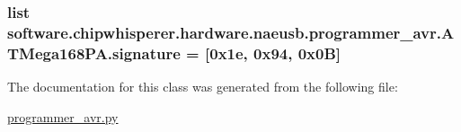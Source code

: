 \subsubsection[{signature}]{\setlength{\rightskip}{0pt plus 5cm}list software.\+chipwhisperer.\+hardware.\+naeusb.\+programmer\+\_\+avr.\+A\+T\+Mega168\+P\+A.\+signature = \mbox{[}0x1e, 0x94, 0x0\+B\mbox{]}\hspace{0.3cm}{\ttfamily [static]}}\label{classsoftware_1_1chipwhisperer_1_1hardware_1_1naeusb_1_1programmer__avr_1_1ATMega168PA_a15680bfcabb39c2127f878eb436594be}


The documentation for this class was generated from the following file\+:\begin{DoxyCompactItemize}
\item 
\hyperlink{programmer__avr_8py}{programmer\+\_\+avr.\+py}\end{DoxyCompactItemize}
